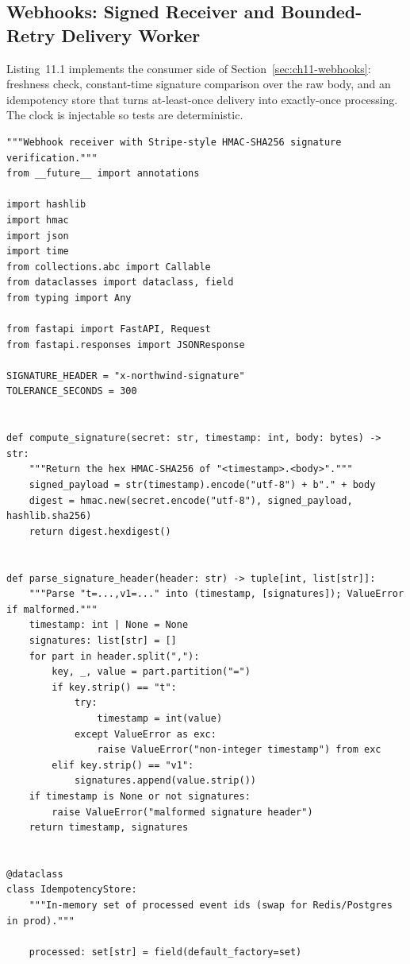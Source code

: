 \subsection{Webhooks: Signed Receiver and Bounded-Retry Delivery Worker}
\label{sec:ch11-code-webhooks}

Listing~11.1 implements the consumer side of
Section~\ref{sec:ch11-webhooks}: freshness check, constant-time signature
comparison over the raw body, and an idempotency store that turns
at-least-once delivery into exactly-once processing. The clock is injectable
so tests are deterministic.

\begin{verbatim}
"""Webhook receiver with Stripe-style HMAC-SHA256 signature verification."""
from __future__ import annotations

import hashlib
import hmac
import json
import time
from collections.abc import Callable
from dataclasses import dataclass, field
from typing import Any

from fastapi import FastAPI, Request
from fastapi.responses import JSONResponse

SIGNATURE_HEADER = "x-northwind-signature"
TOLERANCE_SECONDS = 300


def compute_signature(secret: str, timestamp: int, body: bytes) -> str:
    """Return the hex HMAC-SHA256 of "<timestamp>.<body>"."""
    signed_payload = str(timestamp).encode("utf-8") + b"." + body
    digest = hmac.new(secret.encode("utf-8"), signed_payload, hashlib.sha256)
    return digest.hexdigest()


def parse_signature_header(header: str) -> tuple[int, list[str]]:
    """Parse "t=...,v1=..." into (timestamp, [signatures]); ValueError if malformed."""
    timestamp: int | None = None
    signatures: list[str] = []
    for part in header.split(","):
        key, _, value = part.partition("=")
        if key.strip() == "t":
            try:
                timestamp = int(value)
            except ValueError as exc:
                raise ValueError("non-integer timestamp") from exc
        elif key.strip() == "v1":
            signatures.append(value.strip())
    if timestamp is None or not signatures:
        raise ValueError("malformed signature header")
    return timestamp, signatures


@dataclass
class IdempotencyStore:
    """In-memory set of processed event ids (swap for Redis/Postgres in prod)."""

    processed: set[str] = field(default_factory=set)


\end{verbatim}

